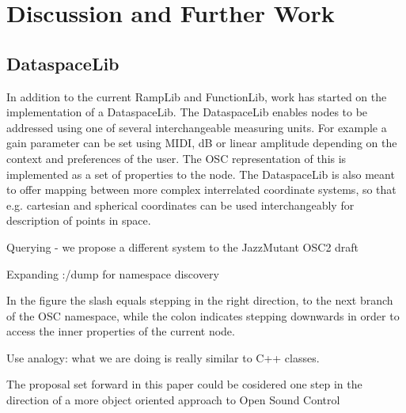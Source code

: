 \documentclass{NIME-alternate}
\begin{document}






\section{Discussion and Further Work} %
\label{sec:discussion_and_further_work}   


\subsection{DataspaceLib} %
\label{sub:dataspacelib}

In addition to the current RampLib and FunctionLib, work has started on the implementation of a DataspaceLib.  The DataspaceLib enables nodes to be addressed using one of several interchangeable measuring units. For example a gain parameter can be set using MIDI, dB or linear amplitude depending on the context and preferences of the user. The OSC representation of this is implemented as a set of properties to the node. The DataspaceLib is also meant to offer mapping between more complex interrelated coordinate systems, so that e.g. cartesian and spherical coordinates can be used interchangeably for description of points in space.




Querying - we propose a different system to the JazzMutant OSC2 draft

Expanding :/dump for namespace discovery

In the figure the slash equals stepping in the right direction, to the next branch of the OSC namespace, while the colon indicates stepping downwards in order to access the inner properties of the current node.

Use analogy: what we are doing is really similar to C++ classes.

The proposal set forward in this paper could be cosidered one step in the direction of a more object oriented approach to Open Sound Control





\end{document}
